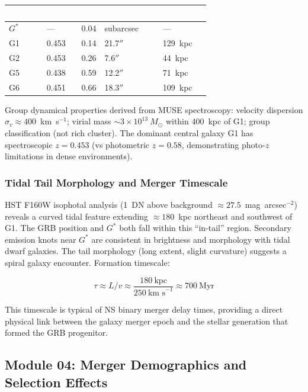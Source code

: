 \documentclass[11pt,letterpaper]{article}
\newcommand{\tableheader}[1]{\textbf{\sffamily\textcolor{white}{#1}}}
\begin{document}
\begin{center}
\begin{tabularx}{\textwidth}{C{1.2cm}C{2.2cm}C{2.2cm}C{2.5cm}C{2.5cm}}
\toprule
{}
\tableheader{Galaxy} & \tableheader{Spec-$z$} & \tableheader{$P_{cc}$} & \tableheader{Angular off.} & \tableheader{Phys. off.} \\
\midrule
$G^*$ & --- & 0.04 & subarcsec & --- \\
G1 & 0.453 & 0.14 & 21.7$''$ & 129~kpc \\
G2 & 0.453 & 0.26 & 7.6$''$ & 44~kpc \\
G5 & 0.438 & 0.59 & 12.2$''$ & 71~kpc \\
G6 & 0.451 & 0.66 & 18.3$''$ & 109~kpc \\
\bottomrule
\end{tabularx}
\end{center}

Group dynamical properties derived from MUSE spectroscopy: velocity dispersion $\sigma_v \approx 400$~km~s$^{-1}$; virial mass $\sim 3 \times 10^{13}~M_\odot$ within 400~kpc of G1; group classification (not rich cluster). The dominant central galaxy G1 has spectroscopic $z = 0.453$ (vs photometric $z = 0.58$, demonstrating photo-$z$ limitations in dense environments).

\subsubsection{Tidal Tail Morphology and Merger Timescale}

HST F160W isophotal analysis (1~DN above background $\approx 27.5$~mag~arcsec$^{-2}$) reveals a curved tidal feature extending $\approx 180$~kpc northeast and southwest of G1. The GRB position and $G^*$ both fall within this ``in-tail'' region. Secondary emission knots near $G^*$ are consistent in brightness and morphology with tidal dwarf galaxies. The tail morphology (long extent, slight curvature) suggests a spiral galaxy encounter. Formation timescale:

$$\tau \approx L/v \approx \frac{180~\text{kpc}}{250~\text{km~s}^{-1}} \approx 700~\text{Myr}$$

This timescale is typical of NS binary merger delay times, providing a direct physical link between the galaxy merger epoch and the stellar generation that formed the GRB progenitor.

\subsection{Module 04: Merger Demographics and Selection Effects}
\end{document}
